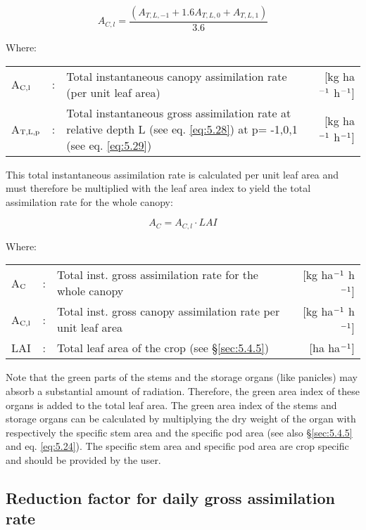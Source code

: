 \begin{equation}
A_{C,l} = {\frac{(A_{T,L,-1} + 1.6 A_{T,L,0} + A_{T,L,1})}{3.6}}
\end{equation}

Where:\\[5pt]
\begin{tabularx}{\textwidth}{llXr}
	A$_{{\rm C,l}}$ &:& Total instantaneous canopy assimilation 
	rate (per unit leaf area)    &    [kg ha$^{{\rm -1}}$ h$^{{\rm -1}}$]\\
	A$_{{\rm T,L,p}}$ &:& Total instantaneous gross assimilation rate at relative 
	depth L (see eq. \ref{eq:5.28}) at p= -1,0,1 (see eq. \ref{eq:5.29})    &    
	[kg ha$^{{\rm -1}}$ h$^{{\rm -1}}$]\\
\end{tabularx}

This total instantaneous assimilation rate is calculated per unit leaf area and must
therefore be multiplied with the leaf area index to yield the total assimilation rate for the
whole canopy:

\begin{equation}
\label{eq:5.31}
A_{C} = A_{C,l} \cdot LAI
\end{equation}

Where:\\[5pt]
\begin{tabularx}{\textwidth}{llXr}
	A$_{{\rm C}}$ &:& Total inst. gross assimilation rate for
	the whole canopy  &  [kg ha$^{{\rm -1}}$ h$^{{\rm -1}}$]\\
	A$_{{\rm C,l}}$ &:& Total inst. gross canopy assimilation rate 
	per unit leaf area &  [kg ha$^{{\rm -1}}$ h$^{{\rm -1}}$]\\
	LAI &:& Total leaf area of the crop (see \S \ref{sec:5.4.5})  & [ha ha$^{{\rm -1}}$]\\
\end{tabularx}

Note that the green parts of the stems and the storage organs (like panicles) may absorb a
substantial amount of radiation. Therefore, the green area index of these organs is added
to the total leaf area. The green area index of the stems and storage organs can be
calculated by multiplying the dry weight of the organ with respectively the specific stem
area and the specific pod area (see also \S \ref{sec:5.4.5} and eq. \ref{eq:5.24}). The specific 
stem area and specific pod area are crop specific and should be provided by the user.


\subsection{Reduction factor for daily gross assimilation rate}
\label{sec:DailyGrossPhotosynthesis}

